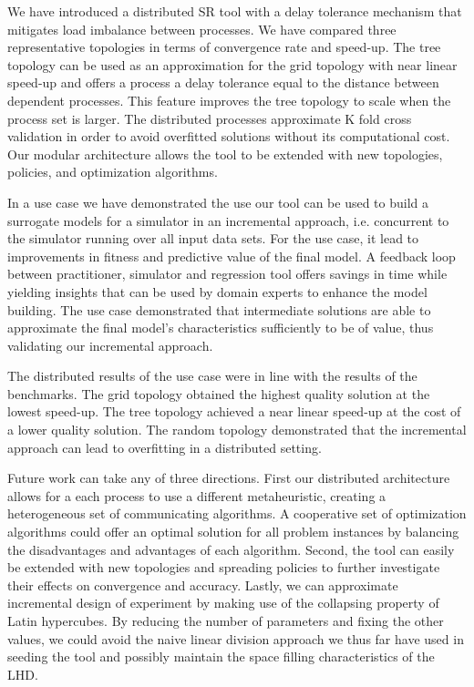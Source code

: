 We have introduced a distributed SR tool with a delay tolerance mechanism that mitigates load imbalance between processes. We have compared three representative topologies in terms of convergence rate and speed-up. The tree topology can be used as an approximation for the grid topology with near linear speed-up and offers a process a delay tolerance equal to the distance between dependent processes. This feature improves the tree topology to scale when the process set is larger. The distributed processes approximate K fold cross validation in order to avoid overfitted solutions without its computational cost. Our modular architecture allows the tool to be extended with new topologies, policies, and optimization algorithms. 

In a use case we have demonstrated the use our tool can be used to build a surrogate models for a simulator in an incremental approach, i.e. concurrent to the simulator running over all input data sets. For the use case, it lead to improvements in fitness and predictive value of the final model. A feedback loop between practitioner, simulator and regression tool offers savings in time while yielding insights that can be used by domain experts to enhance the model building. The use case demonstrated that intermediate solutions are able to approximate the final model's characteristics sufficiently to be of value, thus validating our incremental approach. 

The distributed results of the use case were in line with the results of the benchmarks. The grid topology obtained the highest quality solution at the lowest speed-up. The tree topology achieved a near linear speed-up at the cost of a lower quality solution. The random topology demonstrated that the incremental approach can lead to overfitting in a distributed setting. 

Future work can take any of three directions. First our distributed architecture allows for a each process to use a different metaheuristic, creating a heterogeneous set of communicating algorithms. A cooperative set of optimization algorithms could offer an optimal solution for all problem instances by balancing the disadvantages and advantages of each algorithm. 
Second, the tool can easily be extended with new topologies and spreading policies to further investigate their effects on convergence and accuracy. Lastly, we can approximate incremental design of experiment by making use of the collapsing property of Latin hypercubes. By reducing the number of parameters and fixing the other values, we could avoid the naive linear division approach we thus far have used in seeding the tool and possibly maintain the space filling characteristics of the LHD.
